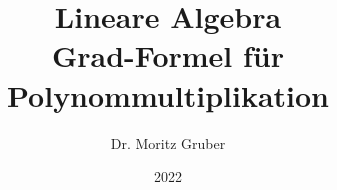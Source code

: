 


\title{Lineare Algebra\\[3mm] 
	\large Grad-Formel für Polynommultiplikation
}
\author{Dr. Moritz Gruber } 
\date{2022}



%
\begin{frame}[plain] 
 \titlepage
\end{frame}
%

